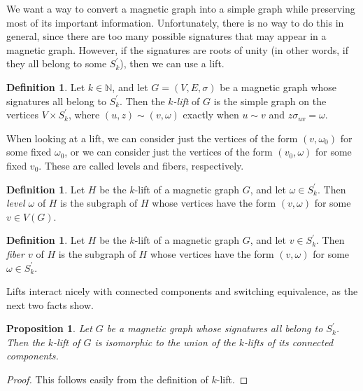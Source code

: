 \documentclass[12pt]{article}
\newtheorem{prop}[thm]{Proposition}
\theoremstyle{definition}
\newtheorem{defn}[thm]{Definition}
\newcommand{\N}{\mathbb N}
\begin{document}
We want a way to convert a magnetic graph into a simple graph while preserving most of its important information. Unfortunately, there is no way to do this in general, since there are too many possible signatures that may appear in a magnetic graph. However, if the signatures are roots of unity (in other words, if they all belong to some $S^\prime_k$), then we can use a lift.

\begin{defn}
Let $k \in \N$, and let $G = (V, E, \sigma)$ be a magnetic graph whose signatures all belong to $S^\prime_k$. Then the \textit{$k$-lift} of $G$ is the simple graph on the vertices $V \times S^\prime_k$, where $(u, z) \sim (v, \omega)$ exactly when $u \sim v$ and $z \sigma_{uv} = \omega$. 
\end{defn}

When looking at a lift, we can consider just the vertices of the form $(v, \omega_0)$ for some fixed $\omega_0$, or we can consider just the vertices of the form $(v_0, \omega)$ for some fixed $v_0$. These are called levels and fibers, respectively. 

\begin{defn}
Let $H$ be the $k$-lift of a magnetic graph $G$, and let $\omega \in S^\prime_k$. Then \textit{level $\omega$} of $H$ is the subgraph of $H$ whose vertices have the form $(v, \omega)$ for some $v \in V(G)$. 
\end{defn}

\begin{defn}
Let $H$ be the $k$-lift of a magnetic graph $G$, and let $v \in S^\prime_k$. Then \textit{fiber $v$} of $H$ is the subgraph of $H$ whose vertices have the form $(v, \omega)$ for some $\omega \in S^\prime_k$. 
\end{defn}

Lifts interact nicely with connected components and switching equivalence, as the next two facts show.

\begin{prop}\label{lifts of connected components}
Let $G$ be a magnetic graph whose signatures all belong to $S^\prime_k$. Then the \textit{$k$-lift} of $G$ is isomorphic to the union of the $k$-lifts of its connected components.
\end{prop}
\begin{proof}
This follows easily from the definition of $k$-lift.
\end{proof}
\end{document}
